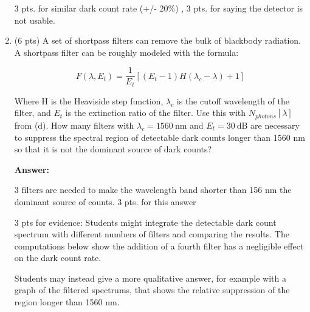 \documentclass[12pt]{caltech_thesis}
\begin{document}
\begin{enumerate}
  {\color{darkred} 3 pts. for similar dark count rate (+/- 20\%) , 3
  pts. for saying the detector is not usable.}
\item
  (6 pts) A set of shortpass filters can remove the bulk of blackbody
  radiation. A shortpass filter can be roughly modeled with the formula:

  \[F(\lambda, E_t) = \frac{1}{E_t}[(E_t - 1)H(\lambda_c - \lambda) + 1]\]

  Where H is the Heaviside step function, \(\lambda_c\) is the cutoff
  wavelength of the filter, and \(E_t\) is the extinction ratio of the
  filter. Use this with \(N_{photons}[\lambda]\) from (d). How many
  filters with \(\lambda_c = 1560~\text{nm}\) and \(E_t = 30~\text{dB}\)
  are necessary to suppress the spectral region of detectable dark
  counts longer than 1560 nm so that it is not the dominant source of
  dark counts?

  {\color{midnightblue}  \textbf{Answer:} }

  {\color{midnightblue} \(\boxed{\text{3 filters}}\) are needed to make
  the wavelength band shorter than 156 nm the dominant source of
  counts.} {\color{darkred} 3 pts. for this answer}

  {\color{darkred} 3 pts for evidence:} {\color{midnightblue} Students
  might integrate the detectable dark count spectrum with different
  numbers of filters and comparing the results. The computations below
  show the addition of a fourth filter has a negligible effect on the
  dark count rate. }

  {\color{midnightblue} Students may instead give a more qualitative
  answer, for example with a graph of the filtered spectrums, that shows
  the relative suppression of the region longer than 1560 nm. }


\end{enumerate}
\end{document}
